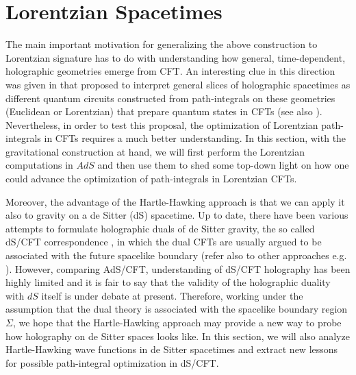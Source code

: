 \documentclass[a4paper,12pt]{article}
\begin{document}
\section{Lorentzian Spacetimes}\label{Sec:6 Lor}
The main important motivation for generalizing the above construction to Lorentzian signature has to do with understanding how general, time-dependent, holographic geometries emerge from CFT. An interesting clue in this direction was given in  \cite{Takayanagi:2018pml} that proposed to interpret general slices of holographic spacetimes as different quantum circuits constructed from path-integrals on these geometries (Euclidean or Lorentzian) that prepare quantum states in CFTs (see also \cite{Milsted:2018yur,Milsted:2018san}). Nevertheless, in order to test this proposal, the optimization of Lorentzian path-integrals in CFTs requires a much better understanding. In this section, with the gravitational construction at hand, we will first perform the Lorentzian computations in $AdS$ and then use them to shed some top-down light on how one could advance the optimization of path-integrals in Lorentzian CFTs.

Moreover, the advantage of the Hartle-Hawking approach is that we can apply it also to gravity on a de Sitter (dS) spacetime. Up to date, there have been various attempts to formulate holographic duals of de Sitter gravity, the so called dS/CFT correspondence \cite{Strominger:2001pn,Maldacena:2002vr}, in which the dual CFTs are usually argued to be associated with the future spacelike boundary (refer also to other approaches e.g. \cite{MT,Dong:2018cuv}). However, comparing AdS/CFT, understanding of dS/CFT holography has been highly limited and it is fair to say that the validity of the holographic duality with $dS$ itself is under debate at present. Therefore, working under the assumption that the dual theory is associated with the spacelike boundary region $\Sigma$, we hope that the Hartle-Hawking approach may provide a new way to probe how holography on de Sitter spaces looks like. In this section, we will also analyze Hartle-Hawking wave functions in de Sitter spacetimes and extract new lessons for possible path-integral optimization in dS/CFT.
 
\end{document}
